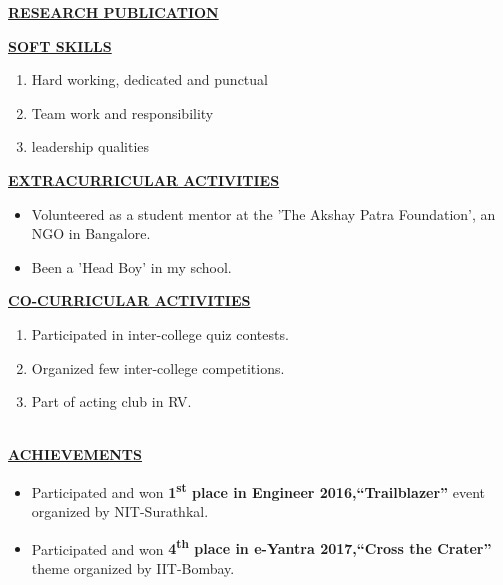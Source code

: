 \documentclass[10pt]{article}
\begin{document}
		
		\underline{\textbf{\Large{RESEARCH PUBLICATION}}}
		\begin{itemize}
			
		\end{itemize}
		
		\hfill 
		\hfill
	
			\underline{\textbf{\Large{SOFT SKILLS}}}
			\begin{enumerate}
				\item{Hard working, dedicated and punctual}
				\item{Team work and responsibility}
				\item{leadership qualities} 
				
			\end{enumerate}
			
			\hfill
			
		\underline{\textbf{\Large{EXTRACURRICULAR ACTIVITIES}}}
		\begin{itemize}
			\item{Volunteered as a student mentor at the 'The Akshay Patra Foundation', an NGO in Bangalore.}
			\item{Been a 'Head Boy' in my school.}
			
		\end{itemize}
		
		\hfill
		
			\underline{\textbf{\Large{CO-CURRICULAR ACTIVITIES}}}
			\begin{enumerate}
				\item{Participated in inter-college quiz contests.}
				\item{Organized few inter-college competitions.}
				\item{Part of acting club in RV.}
				\\	
				\\				
				
			\end{enumerate}
			
			\underline{\textbf{\Large{ACHIEVEMENTS}}}
			\begin{itemize}
				\item{Participated and won \textbf{1\textsuperscript{st}
					place in Engineer 2016,“Trailblazer”} event organized
					by NIT-Surathkal.}
				\item{Participated and won \textbf{4\textsuperscript{th}
					place in e-Yantra 2017,“Cross the Crater”} theme
					organized by IIT-Bombay.}
				
			\end{itemize}
			
\end{document}
